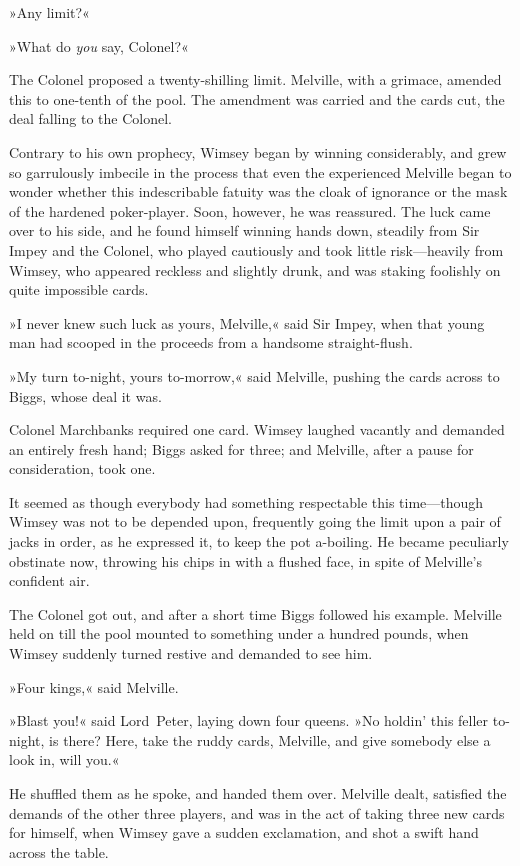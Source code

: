 »Any limit?«

»What do \textit{you} say, Colonel?«

The Colonel proposed a twenty-shilling limit. Melville, with a grimace, amended this to one-tenth of the pool. The amendment was carried and the cards cut, the deal falling to the Colonel.

Contrary to his own prophecy, Wimsey began by winning considerably, and grew so garrulously imbecile in the process that even the experienced Melville began to wonder whether this indescribable fatuity was the cloak of ignorance or the mask of the hardened poker-player. Soon, however, he was reassured. The luck came over to his side, and he found himself winning hands down, steadily from Sir Impey and the Colonel, who played cautiously and took little risk—heavily from Wimsey, who appeared reckless and slightly drunk, and was staking foolishly on quite impossible cards.

»I never knew such luck as yours, Melville,« said Sir Impey, when that young man had scooped in the proceeds from a handsome straight-flush.

»My turn to-night, yours to-morrow,« said Melville, pushing the cards across to Biggs, whose deal it was.

Colonel Marchbanks required one card. Wimsey laughed vacantly and demanded an entirely fresh hand; Biggs asked for three; and Melville, after a pause for consideration, took one.

It seemed as though everybody had something respectable this time—though Wimsey was not to be depended upon, frequently going the limit upon a pair of jacks in order, as he expressed it, to keep the pot a-boiling. He became peculiarly obstinate now, throwing his chips in with a flushed face, in spite of Melville's confident air.

The Colonel got out, and after a short time Biggs followed his example. Melville held on till the pool mounted to something under a hundred pounds, when Wimsey suddenly turned restive and demanded to see him.

»Four kings,« said Melville.

»Blast you!« said Lord~Peter, laying down four queens. »No holdin' this feller to-night, is there? Here, take the ruddy cards, Melville, and give somebody else a look in, will you.«

He shuffled them as he spoke, and handed them over. Melville dealt, satisfied the demands of the other three players, and was in the act of taking three new cards for himself, when Wimsey gave a sudden exclamation, and shot a swift hand across the table.

